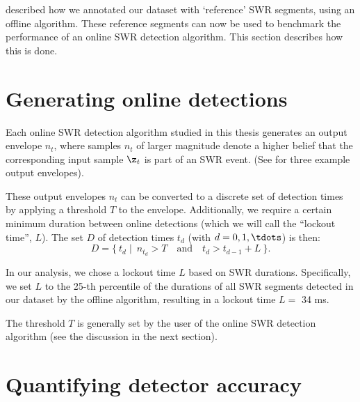 \label{ch:eval}

 described how we annotated our dataset with `reference' SWR segments, using an offline algorithm. These reference segments can now be used to benchmark the performance of an online SWR detection algorithm. This section describes how this is done.



\section{Generating online detections}

Each online SWR detection algorithm studied in this thesis generates an output envelope $n_t$, where samples $n_t$ of larger magnitude denote a higher belief that the corresponding input sample $\z_t$ is part of an SWR event. (See  for three example output envelopes).

These output envelopes $n_t$ can be converted to a discrete set of detection times by applying a threshold $T$ to the envelope.\footnotemark{} Additionally, we require a certain minimum duration between online detections (which we will call the ``lockout time'', $L$). The set $D$ of detection times $t_d$ (with $d = 0, 1, \tdots$) is then:
\begin{equation}
D = \{ \ t_d \mid \  n_{t_d} > T  \quad 
                  \text{and} \quad  t_d > t_{d-1} + L  \ \}.
\end{equation}



In our analysis, we chose a lockout time $L$ based on SWR durations. Specifically, we set $L$ to the 25-th percentile of the durations of all SWR segments detected in our dataset by the offline algorithm, resulting in a lockout time $L = $ 34 ms.

The threshold $T$ is generally set by the user of the online SWR detection algorithm (see the discussion in the next section).



\section{Quantifying detector accuracy}

